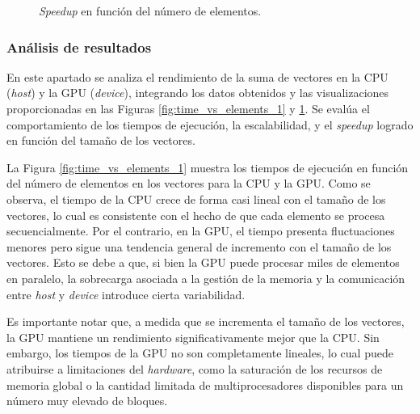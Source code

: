 \documentclass{article}
\begin{document}
			\begin{figure}
				\centering
				\caption{\textit{Speedup} en función del número de elementos.}
				\label{fig:speedup_1}
			\end{figure}

		\subsubsection{Análisis de resultados}

			En este apartado se analiza el rendimiento de la suma de vectores en la CPU (\textit{host}) y la GPU (\textit{device}), integrando los datos obtenidos y las visualizaciones proporcionadas en las Figuras \ref{fig:time_vs_elements_1} y \ref{fig:speedup_1}. Se evalúa el comportamiento de los tiempos de ejecución, la escalabilidad, y el \textit{speedup} logrado en función del tamaño de los vectores.

			La Figura \ref{fig:time_vs_elements_1} muestra los tiempos de ejecución en función del número de elementos en los vectores para la CPU y la GPU. Como se observa, el tiempo de la CPU crece de forma casi lineal con el tamaño de los vectores, lo cual es consistente con el hecho de que cada elemento se procesa secuencialmente. Por el contrario, en la GPU, el tiempo presenta fluctuaciones menores pero sigue una tendencia general de incremento con el tamaño de los vectores. Esto se debe a que, si bien la GPU puede procesar miles de elementos en paralelo, la sobrecarga asociada a la gestión de la memoria y la comunicación entre \textit{host} y \textit{device} introduce cierta variabilidad.

			Es importante notar que, a medida que se incrementa el tamaño de los vectores, la GPU mantiene un rendimiento significativamente mejor que la CPU. Sin embargo, los tiempos de la GPU no son completamente lineales, lo cual puede atribuirse a limitaciones del \textit{hardware}, como la saturación de los recursos de memoria global o la cantidad limitada de multiprocesadores disponibles para un número muy elevado de bloques.
\end{document}
